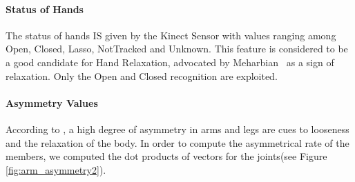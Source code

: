 \documentclass[a4paper,twocolumn]{svjour3}
\begin{document}
\paragraph{Status of Hands}
The status of hands IS given by the Kinect Sensor with values ranging among Open, Closed, Lasso, NotTracked and Unknown. 
This feature is considered to be a good candidate for Hand Relaxation, advocated by Meharbian~\cite{Meharbian} as a sign of relaxation. 
Only the Open and Closed recognition are exploited. 


\paragraph{Asymmetry Values}
According to \cite{Mehrabian}, a high degree of asymmetry in arms and legs are cues to looseness and the relaxation of the body.
In order to compute the asymmetrical rate of the members, we computed the dot products of vectors for the joints(see Figure \ref{fig:arm_asymmetry2}). 

\end{document}
